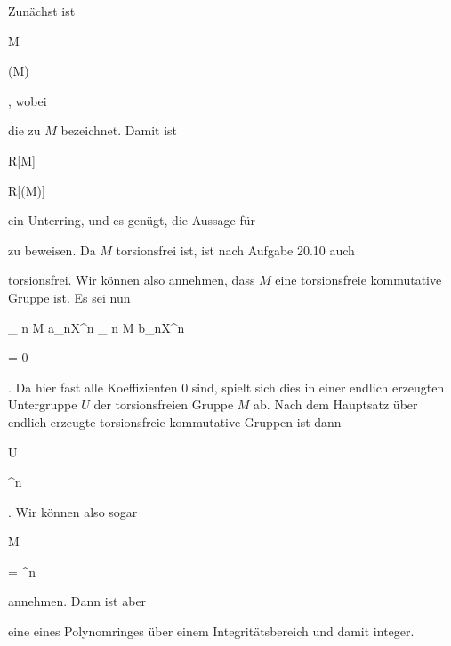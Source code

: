 {


Zunächst ist


\mavergleichskette

{\vergleichskette

{ M
}

{ \subseteq }{ \Gamma(M)
}

{  }{
}

{    }{
}

{   }{
}

}
{}{}{,}
wobei

 die
zu $M$ bezeichnet. Damit ist


\mavergleichskette

{\vergleichskette

{ R[M]
}

{ \subseteq }{ R[\Gamma(M)]
}

{  }{
}

{    }{
}

{   }{
}

}
{}{}{}
ein Unterring, und es genügt, die Aussage für

 zu beweisen. Da $M$ torsionsfrei ist, ist nach
Aufgabe 20.10
auch

 torsionsfrei. Wir können also annehmen, dass $M$ eine torsionsfreie kommutative Gruppe ist. Es sei nun


\mavergleichskettedisp

{\vergleichskette

{ \sum_{ n \in M }  a_nX^n \cdot \sum_{ n \in M }  b_nX^n
}

{ =} { 0
}

{ } {
}

{ } {
}

{ } {
}

}
{}{}{.}
Da hier fast alle Koeffizienten $0$ sind, spielt sich dies in einer endlich erzeugten Untergruppe $U$ der torsionsfreien Gruppe $M$ ab. Nach
dem Hauptsatz über endlich erzeugte torsionsfreie kommutative Gruppen
ist dann


\mavergleichskette

{\vergleichskette

{ U
}

{ \cong }{ \Z^n
}

{  }{
}

{    }{
}

{   }{
}

}
{}{}{.}
Wir können also sogar


\mavergleichskette

{\vergleichskette

{ M
}

{ = }{ \Z^n
}

{  }{
}

{    }{
}

{   }{
}

}
{}{}{}
annehmen. Dann ist aber

 eine
eines Polynomringes über einem Integritätsbereich und damit integer.


}


